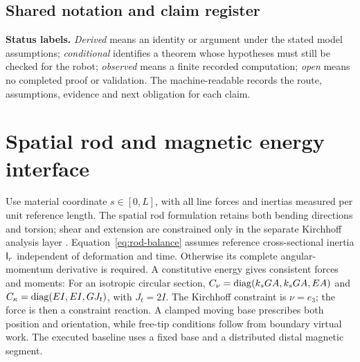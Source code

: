\subsection{Shared notation and claim register}


\textbf{Status labels.} \emph{Derived} means an identity or argument under the stated model assumptions; \emph{conditional} identifies a theorem whose hypotheses must still be checked for the robot; \emph{observed} means a finite recorded computation; \emph{open} means no completed proof or validation. The machine-readable  records the route, assumptions, evidence and next obligation for each claim.

\PaperPage
\section{Spatial rod and magnetic energy interface}
Use material coordinate $s\in[0,L]$, with all line forces and inertias measured per unit reference length. The spatial rod formulation retains both bending directions and torsion; shear and extension are constrained only in the separate Kirchhoff analysis layer \citep{gazzola2018}.
\EqKinematics
\EqRodBalance
Equation~\eqref{eq:rod-balance} assumes reference cross-sectional inertia $\mathsf I_r$ independent of deformation and time. Otherwise its complete angular-momentum derivative is required. A constitutive energy gives consistent forces and moments:
\EqConstitutive
For an isotropic circular section, $C_\nu=\operatorname{diag}(k_sGA,k_sGA,EA)$ and $C_\kappa=\operatorname{diag}(EI,EI,GJ_t)$, with $J_t=2I$. The Kirchhoff constraint is $\nu=e_3$; the force is then a constraint reaction. A clamped moving base prescribes both position and orientation, while free-tip conditions follow from boundary virtual work. The executed baseline uses a fixed base and a distributed distal magnetic segment.

